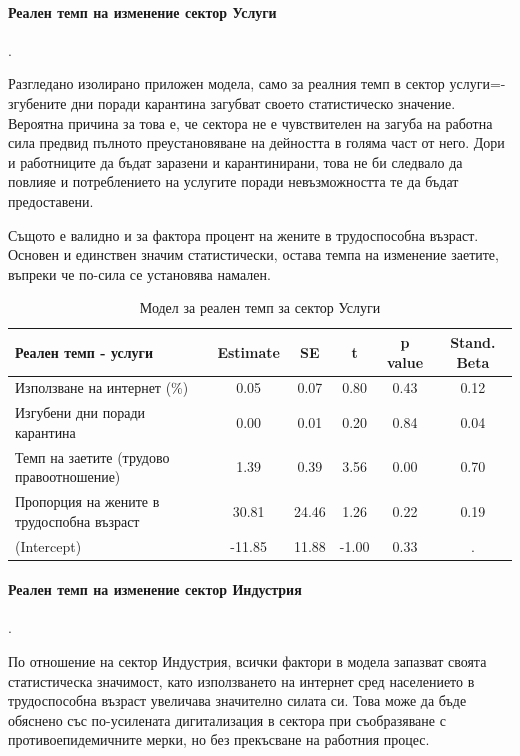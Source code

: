 \documentclass[a4paper,12pt]{article}
\begin{document}
\paragraph{Реален темп на изменение сектор Услуги}.

Разгледано изолирано приложен модела, само за реалния темп в сектор услуги=- згубените дни поради карантина загубват своето статистическо значение. Вероятна причина за това е, че сектора не е чувствителен на загуба на работна сила предвид пълното преустановяване на дейността в голяма част от него. Дори и работниците да бъдат заразени и карантинирани, това не би следвало да повлияе и потреблението на услугите поради невъзможността те да бъдат предоставени.

Същото е валидно и за фактора процент на жените в трудоспособна възраст. Основен и единствен значим статистически, остава темпа на изменение заетите, въпреки че по-сила се установява намален.

\begin{table}[H]
	\centering
	\caption{Модел за реален темп за сектор Услуги}
	\begin{tabular}{lccccc}
		\toprule
		Реален темп - услуги & Estimate & SE    & t     & p value & Stand. Beta \\
		\midrule
		Използване на интернет (\%) & 0.05  & 0.07  & 0.80  & 0.43  & 0.12 \\
		Изгубени дни поради карантина  & 0.00  & 0.01  & 0.20  & 0.84  & 0.04 \\
		Темп на заетите (трудово правоотношение) & 1.39  & 0.39  & 3.56  & 0.00  & 0.70 \\
		Пропорция на жените в трудоспобна възраст  & 30.81 & 24.46 & 1.26  & 0.22  & 0.19 \\
		(Intercept) & -11.85 & 11.88 & -1.00 & 0.33  & . \\
		\bottomrule
	\end{tabular}%
	\label{tab:addlabel}%
\end{table}%

\paragraph{Реален темп на изменение сектор Индустрия}.

По отношение на сектор Индустрия, всички фактори в модела запазват своята статистическа значимост, като използването на интернет сред населението в трудоспособна възраст увеличава значително силата си. Това може да бъде обяснено със по-усилената дигитализация в сектора при съобразяване с противоепидемичните мерки, но без прекъсване на работния процес. 
\end{document}
